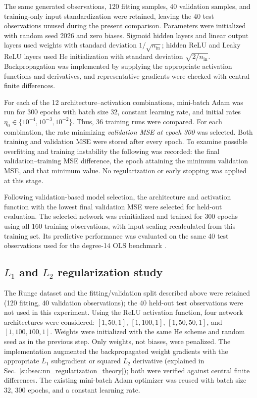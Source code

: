 \documentclass[aps,rmp,reprint,amsmath,amssymb,graphicx,longbibliography]{revtex4-1}
\begin{document}
The same generated observations, 120 fitting samples, 40 validation
samples, and training-only input standardization were
retained, leaving the 40 test observations unused during the present
comparison. Parameters were initialized with random seed 2026 and zero
biases. Sigmoid hidden layers and linear output layers used weights
with standard deviation $1/\sqrt{n_{\mathrm{in}}}$; hidden ReLU and
Leaky ReLU layers used He initialization with standard deviation
$\sqrt{2/n_{\mathrm{in}}}$. Backpropagation was implemented by supplying the appropriate activation
functions and derivatives, and representative gradients were checked
with central finite differences.

For each of the 12 architecture--activation combinations, mini-batch
Adam was run for 300 epochs with batch size 32, constant learning rate,
and initial rates $\eta_0\in\{10^{-4},10^{-3},10^{-2}\}$. Thus, 36
training runs were compared. For each combination, the rate minimizing
\emph{validation MSE at epoch 300} was selected. Both training and
validation MSE were stored after every epoch. To examine possible
overfitting and training instability the following was recorded: the final
validation--training MSE difference, the epoch attaining the minimum
validation MSE, and that minimum value. No regularization or early
stopping was applied at this stage.

Following validation-based model selection, the architecture
and activation function with the lowest final validation MSE
were selected for held-out evaluation. The selected network
was reinitialized and trained for 300 epochs using all 160
training observations, with input scaling recalculated from
this training set. Its predictive performance was evaluated
on the same 40 test observations used for the degree-14 OLS
benchmark \cite{Project_1}.


\subsection{$L_1$ and $L_2$ regularization study}
\label{subsec:partd_methods}

The Runge dataset and the fitting/validation split described above
were retained (120 fitting, 40 validation observations); the 40
held-out test observations were not used in this experiment.
Using the ReLU activation function, four network
architectures were considered: $[1,50,1]$, $[1,100,1]$,
$[1,50,50,1]$, and $[1,100,100,1]$. Weights were initialized with
the same He scheme and random seed as in the previous step. Only weights,
not biases, were penalized. The implementation augmented the
backpropagated weight gradients with the appropriate $L_1$
subgradient or squared $L_2$ derivative (explained in Sec.~\ref{subsec:nn_regularization_theory}); both were verified against
central finite differences. The existing mini-batch Adam optimizer
was reused with batch size 32, 300 epochs, and a constant learning
rate.
\end{document}
